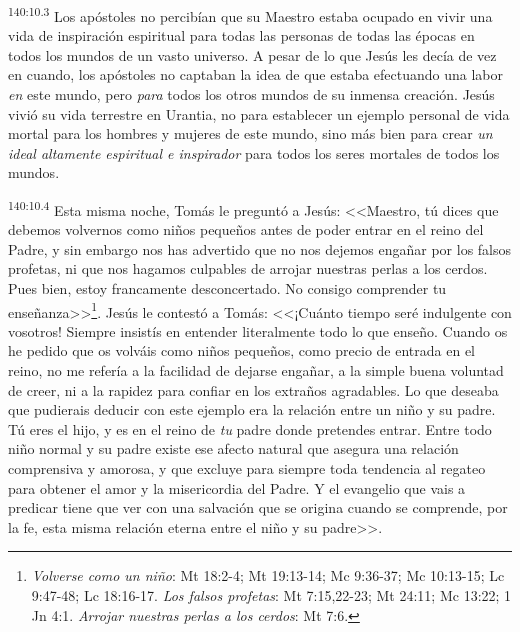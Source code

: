 \par 
\textsuperscript{140:10.3} Los apóstoles no percibían que su Maestro estaba ocupado en vivir una vida de inspiración espiritual para todas las personas de todas las épocas en todos los mundos de un vasto universo. A pesar de lo que Jesús les decía de vez en cuando, los apóstoles no captaban la idea de que estaba efectuando una labor \textit{en} este mundo, pero \textit{para} todos los otros mundos de su inmensa creación. Jesús vivió su vida terrestre en Urantia, no para establecer un ejemplo personal de vida mortal para los hombres y mujeres de este mundo, sino más bien para crear \textit{un ideal altamente espiritual e inspirador} para todos los seres mortales de todos los mundos.

\par 
\textsuperscript{140:10.4} Esta misma noche, Tomás le preguntó a Jesús: <<Maestro, tú dices que debemos volvernos como niños pequeños antes de poder entrar en el reino del Padre, y sin embargo nos has advertido que no nos dejemos engañar por los falsos profetas, ni que nos hagamos culpables de arrojar nuestras perlas a los cerdos. Pues bien, estoy francamente desconcertado. No consigo comprender tu enseñanza>>\footnote{\textit{Volverse como un niño}: Mt 18:2-4; Mt 19:13-14; Mc 9:36-37; Mc 10:13-15; Lc 9:47-48; Lc 18:16-17. \textit{Los falsos profetas}: Mt 7:15,22-23; Mt 24:11; Mc 13:22; 1 Jn 4:1. \textit{Arrojar nuestras perlas a los cerdos}: Mt 7:6.}. Jesús le contestó a Tomás: <<¡Cuánto tiempo seré indulgente con vosotros! Siempre insistís en entender literalmente todo lo que enseño. Cuando os he pedido que os volváis como niños pequeños, como precio de entrada en el reino, no me refería a la facilidad de dejarse engañar, a la simple buena voluntad de creer, ni a la rapidez para confiar en los extraños agradables. Lo que deseaba que pudierais deducir con este ejemplo era la relación entre un niño y su padre. Tú eres el hijo, y es en el reino de \textit{tu} padre donde pretendes entrar. Entre todo niño normal y su padre existe ese afecto natural que asegura una relación comprensiva y amorosa, y que excluye para siempre toda tendencia al regateo para obtener el amor y la misericordia del Padre. Y el evangelio que vais a predicar tiene que ver con una salvación que se origina cuando se comprende, por la fe, esta misma relación eterna entre el niño y su padre>>.

